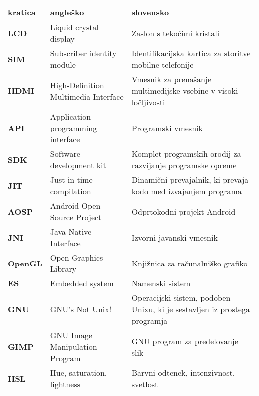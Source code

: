 \begin{tabular}{l|p{5cm}|p{6cm}}
  {\bf kratica} & {\bf angleško} & {\bf slovensko} \\ \hline
  {\bf LCD} & Liquid crystal display & Zaslon s tekočimi kristali \\
  {\bf SIM} & Subscriber identity module & Identifikacijska kartica za storitve mobilne telefonije \\
  {\bf HDMI} & High-Definition Multimedia Interface & Vmesnik za prenašanje multimedijske vsebine v visoki ločljivosti \\
  {\bf API} & Application programming interface & Programski vmesnik \\
  {\bf SDK} & Software development kit & Komplet programskih orodij za razvijanje programske opreme \\
  {\bf JIT} & Just-in-time compilation & Dinamični prevajalnik, ki prevaja kodo med izvajanjem programa \\
  {\bf AOSP} & Android Open Source Project & Odprtokodni projekt Android \\
  {\bf JNI} & Java Native Interface & Izvorni javanski vmesnik \\
  {\bf OpenGL} & Open Graphics Library & Knjižnica za računalniško grafiko \\
  {\bf ES} & Embedded system & Namenski sistem \\
  {\bf GNU} & GNU's Not Unix! & Operacijski sistem, podoben Unixu, ki je sestavljen iz prostega programja \\
  {\bf GIMP} & GNU Image Manipulation Program & GNU program za predelovanje slik \\
  {\bf HSL} & Hue, saturation, lightness & Barvni odtenek, intenzivnost, svetlost
\end{tabular}
